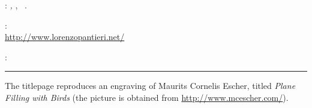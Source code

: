 \thispagestyle{empty}

\hfill

\vfill

\noindent\myName:
\textit{\myTitle,} \mySubTitle,
\textcopyright\ \myTime.

\medskip
{}: \\
\url{http://www.lorenzopantieri.net/}

\medskip
{}: \\

\vspace{1cm}
\hrule
\bigskip

\noindent The titlepage reproduces an engraving of Maurits Cornelis Escher, titled \emph{Plane Filling with Birds} (the picture is obtained from \url{http://www.mcescher.com/}).